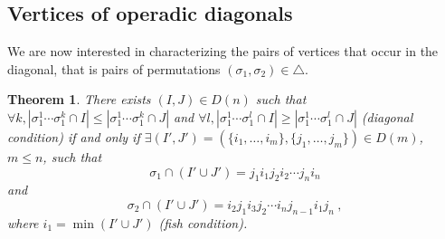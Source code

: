 \documentclass{amsart}
\newtheorem{theorem}{Theorem}[section]
\theoremstyle{definition}
\begin{document}

\subsection{Vertices of operadic diagonals}

We are now interested in characterizing the pairs of vertices that occur in the diagonal, that is pairs of permutations $(\sigma_1,\sigma_2) \in \triangle$. 

\begin{theorem} There exists $(I,J) \in D(n)$ such that $\forall k, |\sigma_1^1\cdots\sigma_1^k \cap I| \leq |\sigma_1^1\cdots\sigma_1^k \cap J|$ and $\forall l, |\sigma_1^1\cdots\sigma_1^l \cap I| \geq |\sigma_1^1\cdots\sigma_1^l \cap J|$ (diagonal condition) if and only if $\exists (I',J')=(\{i_1,\ldots,i_m\},\{j_1,\ldots,j_m\}) \in D(m)$, $m\leq n$, such that \[\sigma_1 \cap (I'\cup J')=j_1 i_1 j_2 i_2 \cdots j_n i_n \] and \[ \sigma_2 \cap (I'\cup J') = i_2 j_1 i_3 j_2 \cdots i_n j_{n-1} i_1 j_n \ , \] where $i_1 = \min (I' \cup J')$ (fish condition). 
\end{theorem}
\end{document}
